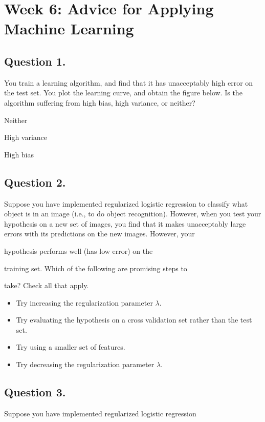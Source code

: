 \documentclass[11pt]{article} %
\begin{document}

\section{Week 6: Advice for Applying Machine Learning}

\subsection*{Question 1. }
You train a learning algorithm, and find that it has unacceptably high error on the test set. You plot the learning curve, and obtain the figure below. Is the algorithm suffering from high bias, high variance, or neither?



Neither

High variance

High bias
\subsection*{Question 2. }
Suppose you have implemented regularized logistic regression  to classify what object is in an image (i.e., to do object recognition). However, when you test your hypothesis on a new set of images, you find that it makes unacceptably large 
errors with its predictions on the new images. However, your

hypothesis performs well (has low error) on the

training set. Which of the following are promising steps to

take? Check all that apply.

\begin{itemize}
\item 
Try increasing the regularization parameter $\lambda$.
\item 
Try evaluating the hypothesis on a cross validation set rather than the test set.
\item 
Try using a smaller set of features.
\item 
Try decreasing the regularization parameter $\lambda$.
\end{itemize}
\subsection*{Question 3. }
Suppose you have implemented regularized logistic regression
\end{document}

